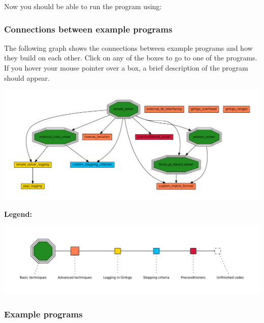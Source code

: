 Now you should be able to run the program using\+:




\label{_graph}%
 \label{Examples_ExampleConnectionGraph}%
%
 \subsubsection*{Connections between example programs}

The following graph shows the connections between example programs and how they build on each other. Click on any of the boxes to go to one of the programs. If you hover your mouse pointer over a box, a brief description of the program should appear. 
\begin{DoxyImageNoCaption}
  \mbox{\includegraphics[width=\textwidth,height=\textheight/2,keepaspectratio=true]{dot_inline_dotgraph_1}}
\end{DoxyImageNoCaption}


{\bfseries Legend\+:}~\newline
 
\begin{DoxyImageNoCaption}
  \mbox{\includegraphics[width=\textwidth,height=\textheight/2,keepaspectratio=true]{dot_inline_dotgraph_2}}
\end{DoxyImageNoCaption}


\label{_list}%
 \subsubsection*{Example programs }

